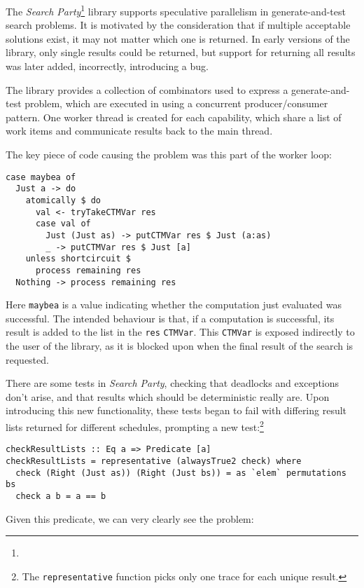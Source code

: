 The \emph{Search Party}\footnote{}
library supports speculative parallelism in generate-and-test search
problems. It is motivated by the consideration that if multiple
acceptable solutions exist, it may not matter which one is
returned. In early versions of the library, only single results could
be returned, but support for returning all results was later added,
incorrectly, introducing a bug.

The library provides a collection of combinators used to express a
generate-and-test problem, which are executed in using a concurrent
producer/consumer pattern. One worker thread is created for each
capability, which share a list of work items and communicate results
back to the main thread.

The key piece of code causing the problem was this part of the worker
loop:

\begin{verbatim}
case maybea of
  Just a -> do
    atomically $ do
      val <- tryTakeCTMVar res
      case val of
        Just (Just as) -> putCTMVar res $ Just (a:as)
        _ -> putCTMVar res $ Just [a]
    unless shortcircuit $
      process remaining res
  Nothing -> process remaining res
\end{verbatim}

Here \verb|maybea| is a value indicating whether the computation just
evaluated was successful. The intended behaviour is that, if a
computation is successful, its result is added to the list in the
\verb|res| \verb|CTMVar|. This \verb|CTMVar| is exposed indirectly to
the user of the library, as it is blocked upon when the final result
of the search is requested.

There are some tests in \emph{Search Party}, checking that deadlocks
and exceptions don't arise, and that results which should be
deterministic really are. Upon introducing this new functionality,
these tests began to fail with differing result lists returned for
different schedules, prompting a new test:\footnote{The
  \texttt{representative} function picks only one trace for each
  unique result.}

\begin{verbatim}
checkResultLists :: Eq a => Predicate [a]
checkResultLists = representative (alwaysTrue2 check) where
  check (Right (Just as)) (Right (Just bs)) = as `elem` permutations bs
  check a b = a == b
\end{verbatim}

Given this predicate, we can very clearly see the problem:

